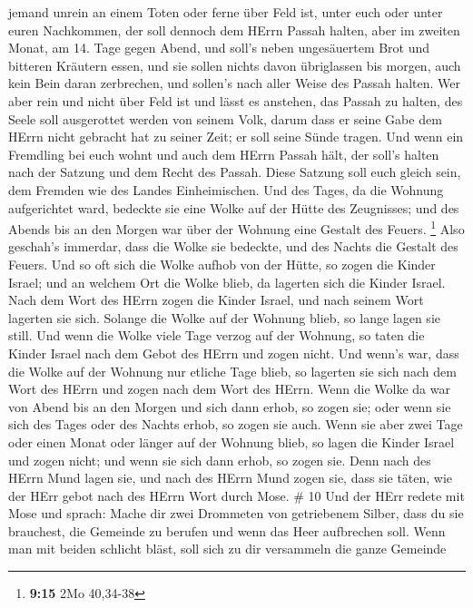 jemand unrein an einem Toten oder ferne über Feld ist, unter euch oder
unter euren Nachkommen, der soll dennoch dem HErrn Passah halten,
 aber im zweiten Monat, am 14. Tage gegen Abend, und soll's
neben ungesäuertem Brot und bitteren Kräutern essen,  und
sie sollen nichts davon übriglassen bis morgen, auch kein Bein daran
zerbrechen, und sollen's nach aller Weise des Passah halten.
 Wer aber rein und nicht über Feld ist und lässt es
anstehen, das Passah zu halten, des Seele soll ausgerottet werden von
seinem Volk, darum dass er seine Gabe dem HErrn nicht gebracht hat zu
seiner Zeit; er soll seine Sünde tragen.  Und wenn ein
Fremdling bei euch wohnt und auch dem HErrn Passah hält, der soll's
halten nach der Satzung und dem Recht des Passah. Diese Satzung soll
euch gleich sein, dem Fremden wie des Landes Einheimischen.
 Und des Tages, da die Wohnung aufgerichtet ward, bedeckte
sie eine Wolke auf der Hütte des Zeugnisses; und des Abends bis an den
Morgen war über der Wohnung eine Gestalt des Feuers. \footnote{\textbf{9:15}
  2Mo 40,34-38}  Also geschah's immerdar, dass die Wolke
sie bedeckte, und des Nachts die Gestalt des Feuers.  Und
so oft sich die Wolke aufhob von der Hütte, so zogen die Kinder Israel;
und an welchem Ort die Wolke blieb, da lagerten sich die Kinder Israel.
 Nach dem Wort des HErrn zogen die Kinder Israel, und nach
seinem Wort lagerten sie sich. Solange die Wolke auf der Wohnung blieb,
so lange lagen sie still.  Und wenn die Wolke viele Tage
verzog auf der Wohnung, so taten die Kinder Israel nach dem Gebot des
HErrn und zogen nicht.  Und wenn's war, dass die Wolke auf
der Wohnung nur etliche Tage blieb, so lagerten sie sich nach dem Wort
des HErrn und zogen nach dem Wort des HErrn.  Wenn die
Wolke da war von Abend bis an den Morgen und sich dann erhob, so zogen
sie; oder wenn sie sich des Tages oder des Nachts erhob, so zogen sie
auch.  Wenn sie aber zwei Tage oder einen Monat oder länger
auf der Wohnung blieb, so lagen die Kinder Israel und zogen nicht; und
wenn sie sich dann erhob, so zogen sie.  Denn nach des
HErrn Mund lagen sie, und nach des HErrn Mund zogen sie, dass sie täten,
wie der HErr gebot nach des HErrn Wort durch Mose. \# 10 
Und der HErr redete mit Mose und sprach:  Mache dir zwei
Drommeten von getriebenem Silber, dass du sie brauchest, die Gemeinde zu
berufen und wenn das Heer aufbrechen soll.  Wenn man mit
beiden schlicht bläst, soll sich zu dir versammeln die ganze Gemeinde
